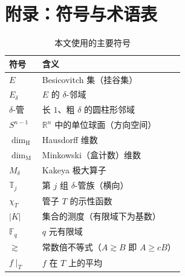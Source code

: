 \section{附录：符号与术语表}\label{sec:appendix}

\begin{table}[htbp]
    \centering
    \caption{本文使用的主要符号}
    \label{tab:notation}
    \begin{tabular}{ll}
        \toprule
        符号 & 含义 \\
        \midrule
        $E$ & Besicovitch 集（挂谷集） \\
        $E_\delta$ & $E$ 的 $\delta$-邻域 \\
        $\delta$-管 & 长 $1$、粗 $\delta$ 的圆柱形邻域 \\
        $S^{n-1}$ & $\mathbb{R}^n$ 中的单位球面（方向空间） \\
        $\dim_{\mathrm{H}}$ & Hausdorff 维数 \\
        $\dim_{\mathrm{M}}$ & Minkowski（盒计数）维数 \\
        $M_\delta$ & Kakeya 极大算子 \\
        $\mathbb{T}_j$ & 第 $j$ 组 $\delta$-管族（横向） \\
        $\chi_{T}$ & 管子 $T$ 的示性函数 \\
        $|K|$ & 集合的测度（有限域下为基数） \\
        $\mathbb{F}_q$ & $q$ 元有限域 \\
        $\gtrsim$ & 常数倍不等式（$A \gtrsim B$ 即 $A \ge cB$） \\
        $f \mid_T$ & $f$ 在 $T$ 上的平均 \\
        \bottomrule
    \end{tabular}
\end{table}

